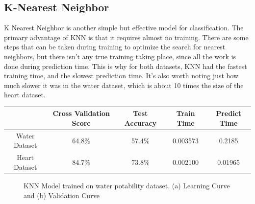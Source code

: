 \documentclass[
	letterpaper, %
]{mlreport}
\begin{document}
\subsection{K-Nearest Neighbor}
K Nearest Neighbor is another simple but effective model for classification. The primary advantage of KNN is that it requires almost no training. There are some steps that can be taken during training to optimize the search for nearest neighbors, but there isn't any true training taking place, since all the work is done during prediction time. This is why for both datasets, KNN had the fastest training time, and the slowest prediction time. It's also worth noting just how much slower it was in the water dataset, which is about 10 times the size of the heart dataset.

\begin{center}
	\begin{tabular}{|c||c|c|c|c|}
	 \hline
	  & Cross Validation Score & Test Accuracy & Train Time & Predict Time \\
	 \hline\hline
	 Water Dataset & 64.8\%  & 57.4\% & 0.003573 & 0.2185 \\
	 \hline
	 Heart Dataset & 84.7\%  & 73.8\% & 0.002100 & 0.01965\\
	 \hline
	\end{tabular}
	\label{table:table5}
\end{center}
\begin{figure}
	\centering
	\caption{KNN Model trained on water potability dataset. (a) Learning Curve and (b) Validation Curve}
	\label{fig:fig12}
\end{figure}
\end{document}
